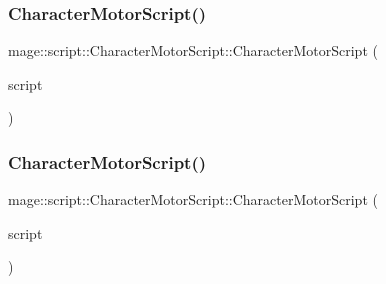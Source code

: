 \subsubsection{\texorpdfstring{Character\+Motor\+Script()}{CharacterMotorScript()}\hspace{0.1cm}{\footnotesize\ttfamily [2/3]}}
{\footnotesize\ttfamily mage\+::script\+::\+Character\+Motor\+Script\+::\+Character\+Motor\+Script (\begin{DoxyParamCaption}\item[{const \hyperlink{classmage_1_1script_1_1_character_motor_script}{Character\+Motor\+Script} \&}]{script }\end{DoxyParamCaption})\hspace{0.3cm}{\ttfamily [delete]}}

\hypertarget{classmage_1_1script_1_1_character_motor_script_ab517e47de6dd2511cc55bd5e49dd5b40}{}\label{classmage_1_1script_1_1_character_motor_script_ab517e47de6dd2511cc55bd5e49dd5b40} 
\subsubsection{\texorpdfstring{Character\+Motor\+Script()}{CharacterMotorScript()}\hspace{0.1cm}{\footnotesize\ttfamily [3/3]}}
{\footnotesize\ttfamily mage\+::script\+::\+Character\+Motor\+Script\+::\+Character\+Motor\+Script (\begin{DoxyParamCaption}\item[{\hyperlink{classmage_1_1script_1_1_character_motor_script}{Character\+Motor\+Script} \&\&}]{script }\end{DoxyParamCaption})\hspace{0.3cm}{\ttfamily [default]}}

\hypertarget{classmage_1_1script_1_1_character_motor_script_a83ed3c2fcb60cef046499fd9c44f86ee}{}\label{classmage_1_1script_1_1_character_motor_script_a83ed3c2fcb60cef046499fd9c44f86ee} 
